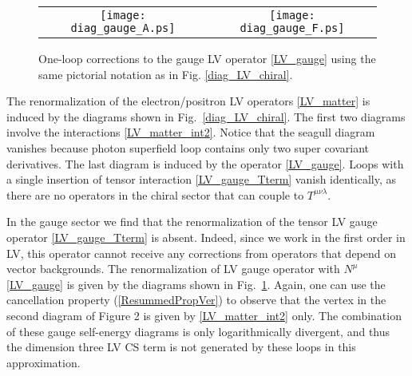 \documentclass[12pt]{revtex4}
\begin{document}
\begin{figure}
\begin{center}
\begin{tabular}{cc}
\texttt{[image: diag\_gauge\_A.ps]}
&
\texttt{[image: diag\_gauge\_F.ps]}
\end{tabular}
\end{center}
\caption{\label{diag_LV_gauge}
One-loop corrections to the gauge LV operator 
\eqref{LV_gauge} using the same pictorial notation as in Fig. 
\ref{diag_LV_chiral}. 
}
\end{figure}


The renormalization of the electron/positron LV operators
\eqref{LV_matter} is induced by the diagrams shown in 
Fig.~\ref{diag_LV_chiral}. The first two diagrams involve the
interactions \eqref{LV_matter_int2}. Notice that the seagull diagram
vanishes because photon superfield loop contains only two super
covariant derivatives. The last diagram is induced by the operator  
\eqref{LV_gauge}. Loops with a single insertion of tensor
interaction \eqref{LV_gauge_Tterm} vanish identically, as there are no
operators in the chiral sector that can couple to $T^{\mu\nu\lambda}$. 


In the gauge sector we find that the renormalization of the tensor LV
gauge operator \eqref{LV_gauge_Tterm} is absent. Indeed, since we 
work in the first order in LV, this operator cannot receive any
corrections from operators that depend on vector backgrounds. The
renormalization of LV gauge operator with $N^\mu$ \eqref{LV_gauge} 
is given by the diagrams shown in Fig.~\ref{diag_LV_gauge}. 
Again, one can use the cancellation property (\ref{ResummedPropVer}) 
to observe that the vertex in the second diagram of Figure 2 is given
by \eqref{LV_matter_int2} only. The combination of these gauge
self-energy diagrams is only logarithmically divergent, and thus the
dimension three LV CS term is not generated by these loops
in this approximation.   
\end{document}
